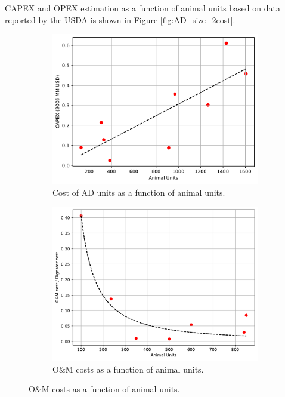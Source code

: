 \begin{refsection}[referencesApD]
CAPEX and OPEX estimation as a function of animal units based on data reported by the USDA \citep{USDA_OM} is shown in Figure \ref{fig:AD_size_2cost}.
\begin{figure}[h!]
	\centering
	\begin{subfigure}[t]{0.7\textwidth}
		\includegraphics[width=\textwidth, trim={0cm 0cm 0cm 0cm},clip]{gfx/AppendixD/AD_SizeCost_Swine.pdf}
		\caption{Cost of AD units as a function of animal units.}
		\label{fig:AD_SizeCost_Swine}
	\end{subfigure}
	\bigskip
	\begin{subfigure}[t]{0.7\textwidth}
		\includegraphics[width=\textwidth]{gfx/AppendixD/AD_size_OM_Unit_cost.pdf} 
		\caption{O\&M costs as a function of animal units.}
		\label{fig:AD_size_OM_Unit_cost}
	\end{subfigure}
	

\end{figure}
\end{refsection}
